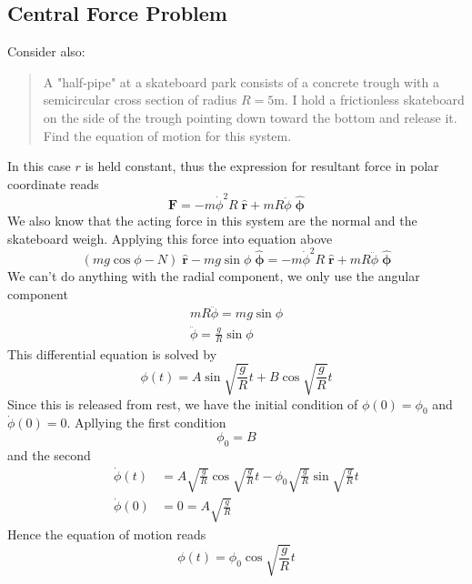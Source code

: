 \documentclass[../../../main.tex]{subfiles}
\begin{document}
\subsection*{Central Force Problem}
Consider also:
\begin{quotation}
    A "half-pipe" at a skateboard park consists of a concrete trough with a semicircular cross section of radius $R = 5 $m. I hold a frictionless skateboard on the side of the trough pointing down toward the bottom and release it. Find the equation of motion for this system.
\end{quotation}

\begin{figure*}[h]
    \centering
\end{figure*}

In this case $r$ is held constant, thus the expression for resultant force in polar coordinate reads
\begin{equation*}
    \mathbf{F}=-m\dot{\phi}^2R\;\mathbf{\hat{r}}+ mR\ddot{\phi} \;\boldsymbol{ \hat{\phi}}
\end{equation*}
We also know that the acting force in this system are the normal and the skateboard weigh. Applying this force into equation above
\begin{equation*}
    \left(mg\cos\phi-N\right) \;\mathbf{\hat{r}}-mg\sin\phi\; \boldsymbol{ \hat{\phi}}=-m\dot{\phi}^2R\;\mathbf{\hat{r}}+ mR\ddot{\phi} \;\boldsymbol{ \hat{\phi}}
\end{equation*}
We can't do anything with the radial component, we only use the angular component
\begin{align*}
    mR\ddot{\phi} = mg\sin\phi \\
    \ddot{\phi} = {\frac{g}{R}} \sin\phi
\end{align*}
This differential equation is solved by 
\begin{equation*}
    \phi(t)=A\sin \sqrt{\frac{g}{R}}t +B\cos \sqrt{\frac{g}{R}}t
\end{equation*}
Since this is released from rest, we have the initial condition of $\phi(0)=\phi_0$ and $\dot{\phi}(0)=0$. Apllying the first condition
\begin{equation*}
    \phi_0=B
\end{equation*}
and the second
\begin{align*}
    \dot{\phi}(t)&=A\sqrt{\frac{g}{R}} \cos \sqrt{\frac{g}{R}}t -\phi_0\sqrt{\frac{g}{R}}\sin \sqrt{\frac{g}{R}}t\\
    \dot{\phi}(0)&=0=A\sqrt{\frac{g}{R}}
\end{align*}
Hence the equation of motion reads
\begin{equation*}
    \phi(t)=\phi_0\cos \sqrt{\frac{g}{R}}t
\end{equation*}
\end{document}
